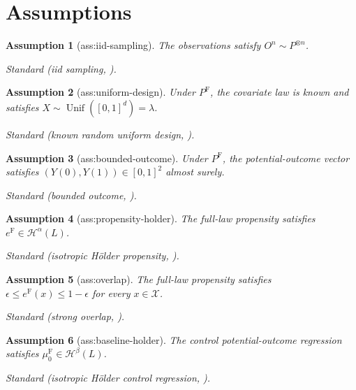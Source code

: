\documentclass{article}
\newtheorem{assumption}{Assumption}
\begin{document}
\section{Assumptions}

\begin{assumption}[ass:iid-sampling]\label{ass:iid-sampling}
The observations satisfy \(O^n\sim P^{\otimes n}\).
\par\smallskip\noindent\emph{Standard} (iid sampling, \cite{CrumpHotzImbensMitnik2008}).
\end{assumption}

\begin{assumption}[ass:uniform-design]\label{ass:uniform-design}
Under \(P^{\mathrm F}\), the covariate law is known and satisfies \(X\sim\operatorname{Unif}([0,1]^d)=\lambda\).
\par\smallskip\noindent\emph{Standard} (known random uniform design, \cite{IngsterSapatinas2009}).
\end{assumption}

\begin{assumption}[ass:bounded-outcome]\label{ass:bounded-outcome}
Under \(P^{\mathrm F}\), the potential-outcome vector satisfies \((Y(0),Y(1))\in[0,1]^2\) almost surely.
\par\smallskip\noindent\emph{Standard} (bounded outcome, \cite{LuedtkeCaroneVanDerLaan2019}).
\end{assumption}

\begin{assumption}[ass:propensity-holder]\label{ass:propensity-holder}
The full-law propensity satisfies \(e^{\mathrm F}\in\mathcal H^\alpha(L)\).
\par\smallskip\noindent\emph{Standard} (isotropic Hölder propensity, \cite{KennedyBalakrishnanRobinsWasserman2024}).
\end{assumption}

\begin{assumption}[ass:overlap]\label{ass:overlap}
The full-law propensity satisfies \(\epsilon\le e^{\mathrm F}(x)\le1-\epsilon\) for every \(x\in\mathcal X\).
\par\smallskip\noindent\emph{Standard} (strong overlap, \cite{CrumpHotzImbensMitnik2008}).
\end{assumption}

\begin{assumption}[ass:baseline-holder]\label{ass:baseline-holder}
The control potential-outcome regression satisfies \(\mu_0^{\mathrm F}\in\mathcal H^\beta(L)\).
\par\smallskip\noindent\emph{Standard} (isotropic Hölder control regression, \cite{KennedyBalakrishnanRobinsWasserman2024}).
\end{assumption}
\end{document}
